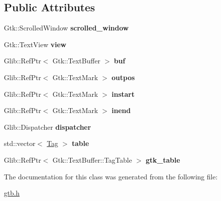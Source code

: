\subsection*{Public Attributes}
\begin{DoxyCompactItemize}
\item 
\mbox{\label{a00036_a2e64415ee404103528cd33bbdb323fb2}} 
Gtk\+::\+Scrolled\+Window {\bfseries scrolled\+\_\+window}
\item 
\mbox{\label{a00036_a3fc0002fbdf62b9c1f402b31b8b1568e}} 
Gtk\+::\+Text\+View {\bfseries view}
\item 
\mbox{\label{a00036_aed9ad861f7a9c6bdff6df63ea699b1f8}} 
Glib\+::\+Ref\+Ptr$<$ Gtk\+::\+Text\+Buffer $>$ {\bfseries buf}
\item 
\mbox{\label{a00036_a0fd9f0ab15e2af9d4963d6e4699f5053}} 
Glib\+::\+Ref\+Ptr$<$ Gtk\+::\+Text\+Mark $>$ {\bfseries outpos}
\item 
\mbox{\label{a00036_a942054c00c3266ce86e08b69674bb403}} 
Glib\+::\+Ref\+Ptr$<$ Gtk\+::\+Text\+Mark $>$ {\bfseries instart}
\item 
\mbox{\label{a00036_ae5de8dda2b454bbcee99e7dc91ec7a05}} 
Glib\+::\+Ref\+Ptr$<$ Gtk\+::\+Text\+Mark $>$ {\bfseries inend}
\item 
\mbox{\label{a00036_a46bb865cf2e4b8efd0f47d37b03b5a77}} 
Glib\+::\+Dispatcher {\bfseries dispatcher}
\item 
\mbox{\label{a00036_a52395c2d9848125f2809d0c1b3ed41dc}} 
std\+::vector$<$ \hyperlink{a00028}{Tag} $>$ {\bfseries table}
\item 
\mbox{\label{a00036_ad01f445b4bf1618d14ca83b49c01204e}} 
Glib\+::\+Ref\+Ptr$<$ Gtk\+::\+Text\+Buffer\+::\+Tag\+Table $>$ {\bfseries gtk\+\_\+table}
\end{DoxyCompactItemize}


The documentation for this class was generated from the following file\+:\begin{DoxyCompactItemize}
\item 
\hyperlink{a00005}{gtb.\+h}\end{DoxyCompactItemize}
